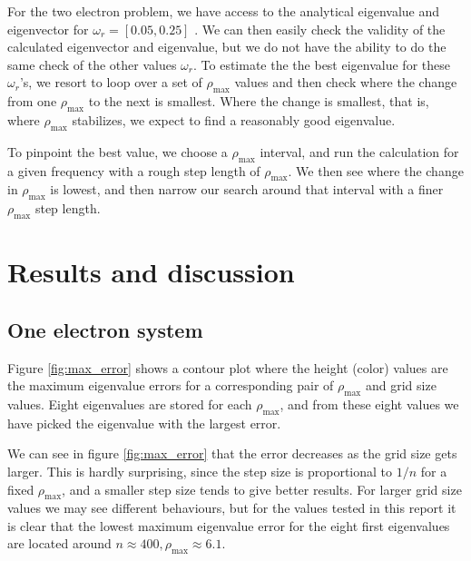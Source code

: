 \documentclass{emulateapj}
\begin{document}
        For the two electron problem, we have access to the analytical eigenvalue and eigenvector for $\omega_r = [0.05, 0.25]$ \cite{two_electrons_eigenvalues}. We can then easily check the validity of the calculated eigenvector and eigenvalue, but we do not have the ability to do the same check of the other values $\omega_r$. To estimate the the best eigenvalue for these $\omega_r$'s, we resort to loop over a set of $\rho_{\text{max}}$ values and then check where the change from one $\rho_{\text{max}}$ to the next is smallest. Where the change is smallest, that is, where $\rho_{\text{max}}$ stabilizes, we expect to find a reasonably good eigenvalue.
        
        To pinpoint the best value, we choose a $\rho_{\text{max}}$ interval, and run the calculation for a given frequency with a rough step length of $\rho_{\text{max}}$. We then see where the change in $\rho_{\text{max}}$ is lowest, and then narrow our search around that interval with a finer $\rho_{\text{max}}$ step length.
        
        
\section{\textbf{Results and discussion}}
    \subsection{\textbf{One electron system}}
        Figure \ref{fig:max_error} shows a contour plot where the height (color) values are the maximum eigenvalue errors for a corresponding pair of $\rho_{\text{max}}$ and grid size values. Eight eigenvalues are stored for each $\rho_{\text{max}}$, and from these eight values we have picked the eigenvalue with the largest error.
        
        We can see in figure \ref{fig:max_error} that the error decreases as the grid size gets larger. This is hardly surprising, since the step size is proportional to $1/n$ for a fixed $\rho_{\text{max}}$, and a smaller step size tends to give better results. For larger grid size values we may see different behaviours, but for the values tested in this report it is clear that the lowest maximum eigenvalue error for the eight first eigenvalues are located around $n \approx 400, \rho_{\text{max}} \approx 6.1$.
        
\end{document}

